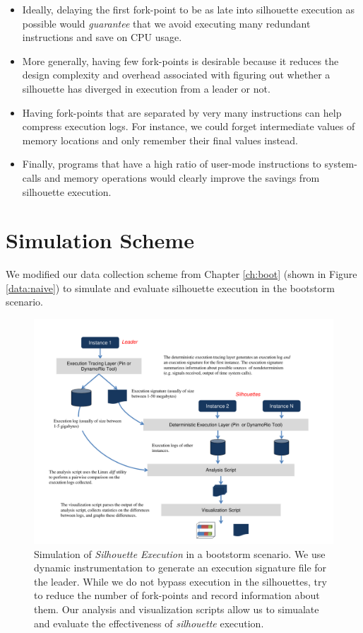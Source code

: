 \begin{itemize}
\item Ideally, delaying the first fork-point
to be as late into silhouette execution as possible
would {\em guarantee} that we avoid
executing many redundant instructions and
save on CPU usage.
\item More generally, having few
fork-points is desirable because it reduces
the design complexity and overhead associated with 
figuring out whether a silhouette has diverged
in execution from a leader or not.
\item Having fork-points that are
separated by very many instructions
can help compress execution logs.
For instance, we could forget intermediate
values of memory locations and only
remember their final values instead.
\item Finally, programs that have a high
ratio of user-mode instructions to system-calls
and memory operations would clearly 
improve the savings from silhouette execution.
\end{itemize}

\section{Simulation Scheme} \label{silsimulation}
We modified our data collection scheme from Chapter \ref{ch:boot} (shown in 
Figure \ref{data:naive}) to simulate and
evaluate silhouette execution in the bootstorm scenario.

\begin{figure}[]
  \center
  \includegraphics[scale=0.7, trim=1cm 0cm 1cm 0cm]
                  {simulation.pdf}
  \caption[Simulation of {\em Silhouette Execution} in a bootstorm scenario]%
  {Simulation of {\em Silhouette Execution} in a bootstorm scenario.
    We use dynamic instrumentation to 
    generate an execution signature file for the leader.
    While we do not bypass execution in the 
    silhouettes, try to reduce the number of fork-points 
    and record information about them.
    Our analysis and visualization
    scripts allow us to simualate and evaluate
    the effectiveness of {\em silhouette} execution.
  }
  \label{ch3:figsimulation}
\end{figure}

